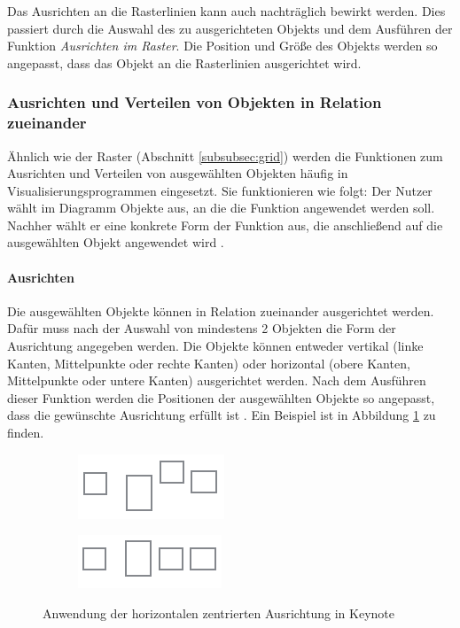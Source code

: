 Das Ausrichten an die Rasterlinien kann auch nachträglich bewirkt werden. Dies passiert durch die Auswahl des zu ausgerichteten Objekts und dem Ausführen der Funktion \textit{Ausrichten im Raster}. Die Position und Größe des Objekts werden so angepasst, dass das Objekt an die Rasterlinien ausgerichtet wird.

\subsubsection{Ausrichten und Verteilen von Objekten in Relation zueinander}
\label{subsubsec:alignment-and-distribution}

Ähnlich wie der Raster (Abschnitt \ref{subsubsec:grid}) werden die Funktionen zum Ausrichten und Verteilen von ausgewählten Objekten häufig in Visualisierungsprogrammen eingesetzt. Sie funktionieren wie folgt: Der Nutzer wählt im Diagramm Objekte aus, an die die Funktion angewendet werden soll. Nachher wählt er eine konkrete Form der Funktion aus, die anschließend auf die ausgewählten Objekt angewendet wird \cite{11Keynote}.

\paragraph{Ausrichten}

Die ausgewählten Objekte können in Relation zueinander ausgerichtet werden. Dafür muss nach der Auswahl von mindestens 2 Objekten die Form der Ausrichtung angegeben werden. Die Objekte können entweder vertikal (linke Kanten, Mittelpunkte oder rechte Kanten) oder horizontal (obere Kanten, Mittelpunkte oder untere Kanten) ausgerichtet werden. Nach dem Ausführen dieser Funktion werden die Positionen der ausgewählten Objekte so angepasst, dass die gewünschte Ausrichtung erfüllt ist \cite{11Keynote, 08OmniGraffle}. Ein Beispiel ist in Abbildung \ref{fig:keynote-horizontal-alignment} zu finden.

\begin{figure}[hbt]
    \newcommand{\subfigurewidth}{0.5\textwidth}
    \begin{subfigure}{\subfigurewidth}
        \centering
        \includegraphics{resources/keynote-horizontal-alignment-a}
        \caption{}
    \end{subfigure}
    \begin{subfigure}{\subfigurewidth}
        \centering
        \includegraphics{resources/keynote-horizontal-alignment-b}
        \caption{}
    \end{subfigure}
    \caption{Anwendung der horizontalen zentrierten Ausrichtung in Keynote}
    \label{fig:keynote-horizontal-alignment}
\end{figure}

